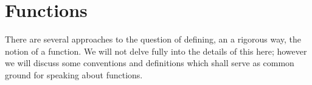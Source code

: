 \section{Functions}



There are several approaches to the question of defining, an a rigorous way, the notion of a function. We will not delve fully into the details of this here; however we will discuss some conventions and definitions which shall serve as common ground for speaking about functions. 


\clearpage
